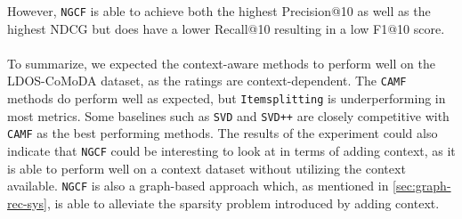 However, \texttt{NGCF} is able to achieve both the highest Precision@10 as well as the highest NDCG but does have a lower Recall@10 resulting in a low F1@10 score.
\\\\
To summarize, we expected the context-aware methods to perform well on the LDOS-CoMoDA dataset, as the ratings are context-dependent. 
The \texttt{CAMF} methods do perform well as expected, but \texttt{Itemsplitting} is underperforming in most metrics.
Some baselines such as \texttt{SVD} and \texttt{SVD++} are closely competitive with \texttt{CAMF} as the best performing methods.
The results of the experiment could also indicate that \texttt{NGCF} could be interesting to look at in terms of adding context, as it is able to perform well on a context dataset without utilizing the context available. 
\texttt{NGCF} is also a graph-based approach which, as mentioned in \autoref{sec:graph-rec-sys}, is able to alleviate the sparsity problem introduced by adding context.
